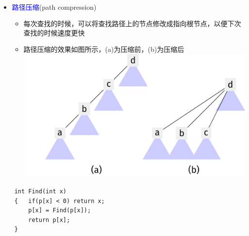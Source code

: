 \begin{itemize}
    \item \textcolor{blue}{路径压缩}(path compression)
    \begin{itemize}
        \item 每次查找的时候，可以将查找路径上的节点修改成指向根节点，以便下次查找的时候速度更快
        \item 路径压缩的效果如图所示，(a)为压缩前，(b)为压缩后
        \includegraphics[scale=.8]{fig/6-2.pdf}
    \end{itemize} 
\end{itemize}
\begin{lstlisting}
    int Find(int x)
    {   if(p[x] < 0) return x;
        p[x] = Find(p[x]);
        return p[x];
    }
\end{lstlisting}

